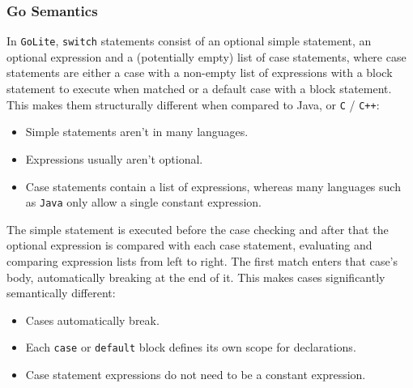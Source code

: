 \documentclass[11pt]{article}
\begin{document}
\subsubsection{Go Semantics}
\label{sec:org8aaa8c1}
In \texttt{GoLite}, \texttt{switch} statements consist of an optional simple
statement, an optional expression and a (potentially empty) list
of case statements, where case statements are either a case with a
non-empty list of expressions with a block statement to execute
when matched or a default case with a block statement. This makes
them structurally different when compared to Java, or \texttt{C} / \texttt{C++}:
\begin{itemize}
\item Simple statements aren't in many languages.
\item Expressions usually aren't optional.
\item Case statements contain a list of expressions, whereas many
languages such as \texttt{Java} only allow a single constant expression.
\end{itemize}
The simple statement is executed before the case checking and
after that the optional expression is compared with each case
statement, evaluating and comparing expression lists from left to
right. The first match enters that case's body, automatically
breaking at the end of it. This makes cases significantly semantically different:
\begin{itemize}
\item Cases automatically break.
\item Each \texttt{case} or \texttt{default} block defines its own scope for declarations.
\item Case statement expressions do not need to be a constant expression.
\end{itemize}
\end{document}
